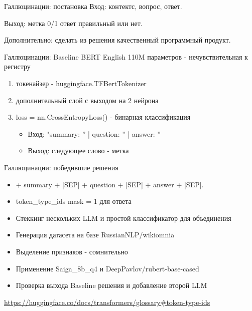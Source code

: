 \documentclass[presentation]{beamer}
\begin{document}
\begin{frame}[label={sec:orgec393f8}]{Галлюцинации: постановка}
Вход: контектс, вопрос, ответ.

Выход: метка 0/1 ответ правильный или нет.

Дополнительно: сделать из решения качественный программный продукт.
\end{frame}
\begin{frame}[label={sec:orgbc883a3}]{Галлюцинации: Baseline}
BERT English 110M параметров - нечувствительная к регистру
\begin{enumerate}
\item токенайзер - huggingface.TFBertTokenizer
\item дополнительный слой с выходом на 2 нейрона
\item loss = nn.CrossEntropyLoss() - бинарная классификация
\begin{itemize}
\item Вход: "summary: '' | question: '' | answer: ''
\item Выход: следующее слово - метка
\end{itemize}
\end{enumerate}
\end{frame}
\begin{frame}[label={sec:org4927162}]{Галлюцинации: победившие решения}
\begin{itemize}
\item\relax [CLS] + summary + [SEP] + question + [SEP] + answer + [SEP].
\item token\_type\_ids mask = 1 для ответа
\item Стеккинг нескольких LLM и простой классификатор для объединения
\item Генерация датасета на базе RussianNLP/wikiomnia
\item Выделение признаков - сомнительно
\item Применение Saiga\_8b\_q4 и DeepPavlov/rubert-base-cased
\item Проверка выхода Baseline решения и добавление второй LLM
\end{itemize}









\url{https://huggingface.co/docs/transformers/glossary\#token-type-ids}
\end{frame}
\end{document}
